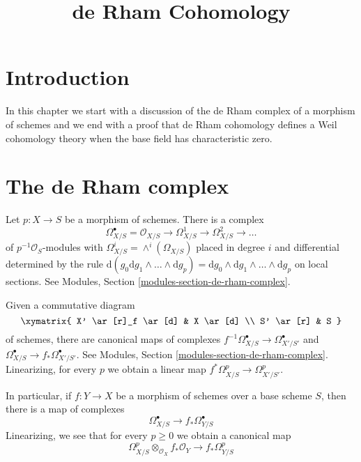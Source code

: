

%


\title{de Rham Cohomology}


\maketitle

\label{section-phantom}

\tableofcontents

\section{Introduction}
\label{section-introduction}

\noindent
In this chapter we start with a discussion of the de Rham complex
of a morphism of schemes and we end with a proof that de Rham cohomology
defines a Weil cohomology theory when the base field has characteristic zero.




\section{The de Rham complex}
\label{section-de-rham-complex}

\noindent
Let $p : X \to S$ be a morphism of schemes. There is a complex
$$
\Omega^\bullet_{X/S} =
\mathcal{O}_{X/S} \to \Omega^1_{X/S} \to \Omega^2_{X/S} \to \ldots
$$
of $p^{-1}\mathcal{O}_S$-modules with
$\Omega^i_{X/S} = \wedge^i(\Omega_{X/S})$
placed in degree $i$ and differential determined by the rule
$\text{d}(g_0 \text{d}g_1 \wedge \ldots \wedge \text{d}g_p) =
\text{d}g_0 \wedge \text{d}g_1 \wedge \ldots \wedge \text{d}g_p$
on local sections.
See Modules, Section \ref{modules-section-de-rham-complex}.

\medskip\noindent
Given a commutative diagram
$$
\xymatrix{
X' \ar[r]_f \ar[d] & X \ar[d] \\
S' \ar[r] & S
}
$$
of schemes, there are canonical maps of complexes
$f^{-1}\Omega_{X/S}^\bullet \to \Omega^\bullet_{X'/S'}$ and
$\Omega_{X/S}^\bullet \to f_*\Omega^\bullet_{X'/S'}$.
See Modules, Section \ref{modules-section-de-rham-complex}.
Linearizing, for every $p$ we obtain a linear map
$f^*\Omega^p_{X/S} \to \Omega^p_{X'/S'}$.

\medskip\noindent
In particular, if $f : Y \to X$ be a morphism of schemes over
a base scheme $S$, then there is a map of complexes
$$
\Omega^\bullet_{X/S} \longrightarrow f_*\Omega^\bullet_{Y/S}
$$
Linearizing, we see that for every $p \geq 0$ we obtain a canonical map
$$
\Omega^p_{X/S} \otimes_{\mathcal{O}_X} f_*\mathcal{O}_Y
\longrightarrow
f_*\Omega^p_{Y/S}
$$

